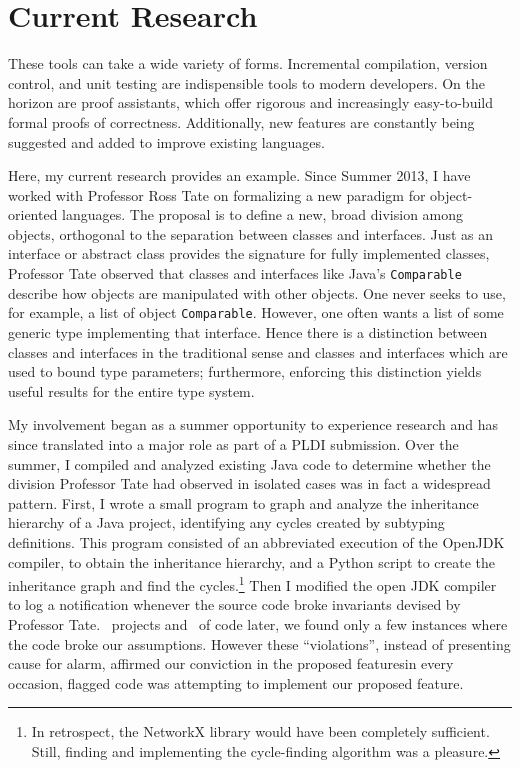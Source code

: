 \documentclass{article}
\begin{document}
\section{Current Research}
These tools can take a wide variety of forms. 
Incremental compilation, version control, and unit testing are indispensible tools to modern developers.
On the horizon are proof assistants, which offer rigorous and increasingly easy-to-build formal proofs of correctness.
Additionally, new features are constantly being suggested and added to improve existing languages.

Here, my current research provides an example.
Since Summer 2013, I have worked with Professor Ross Tate on formalizing a new paradigm for object-oriented languages.
The proposal is to define a new, broad division among objects, orthogonal to the separation between classes and interfaces.
Just as an interface or abstract class provides the signature for fully implemented classes, Professor Tate observed that classes and interfaces like Java's \texttt{Comparable} describe how objects are manipulated with other objects.
One never seeks to use, for example, a list of object \texttt{Comparable}.
However, one often wants a list of some generic type implementing that interface.
Hence there is a distinction between classes and interfaces in the traditional sense and classes and interfaces which are used to bound type parameters; furthermore, enforcing this distinction yields useful results for the entire type system.

My involvement began as a summer opportunity to experience research and has since translated into a major role as part of a PLDI submission.
Over the summer, I compiled and analyzed existing Java code to determine whether the division Professor Tate had observed in isolated cases was in fact a widespread pattern.
First, I wrote a small program to graph and analyze the inheritance hierarchy of a Java project, identifying any cycles created by subtyping definitions.
This program consisted of an abbreviated execution of the OpenJDK compiler, to obtain the inheritance hierarchy, and a Python script to create the inheritance graph and find the cycles.\footnote{In retrospect, the NetworkX library would have been completely sufficient. Still, finding and implementing the cycle-finding algorithm was a pleasure.}
Then I modified the open JDK compiler to log a notification whenever the source code broke invariants devised by Professor Tate.
\numprojects\ projects and \sloc\ of code later, we found only a few instances where the code broke our assumptions.
However these ``violations'', instead of presenting cause for alarm, affirmed our conviction in the proposed features\textemdash in every occasion, flagged code was attempting to implement our proposed feature.
\end{document}

